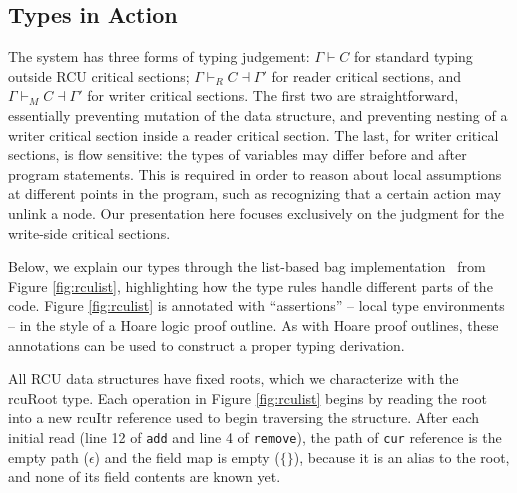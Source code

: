 \subsection{Types in Action}
\label{subsection:type-action}

The system has three forms of typing judgement: 
$\Gamma \vdash C$ for standard typing outside RCU critical sections; 
$\Gamma \vdash_R C \dashv \Gamma'$ for reader critical sections, and
$\Gamma \vdash_M C \dashv \Gamma'$ for writer critical sections.
The first two are straightforward, essentially preventing mutation of the data structure, and preventing nesting of a writer critical section inside a reader critical section.
The last, for writer critical sections, is flow sensitive: the types of variables may differ before and after program statements.  This is required in order to reason about local assumptions at different points in the program, such as recognizing that a certain action may unlink a node.
Our presentation here focuses exclusively on the judgment for the write-side critical sections.

Below, we explain our types through the list-based bag implementation~\cite{McKenney2015SomeEO} from Figure \ref{fig:rculist}, highlighting how the type rules handle different parts of the code.
Figure \ref{fig:rculist} is annotated with ``assertions'' -- local type environments -- in the style of a Hoare logic proof outline.  As with Hoare proof outlines, these annotations can be used to construct a proper typing derivation.

All \textsf{RCU} data structures have fixed roots, which we characterize with the \textsf{rcuRoot} type.  Each operation in Figure \ref{fig:rculist} begins by reading the root into a new \textsf{rcuItr} reference used to begin traversing the structure.
After each initial read (line 12 of \lstinline|add| and line 4 of \lstinline|remove|), the path of \texttt{cur} reference is the empty path ($\epsilon$) and the field map is empty ($\{\}$), because it is an alias to the root, and none of its field contents are known yet.

